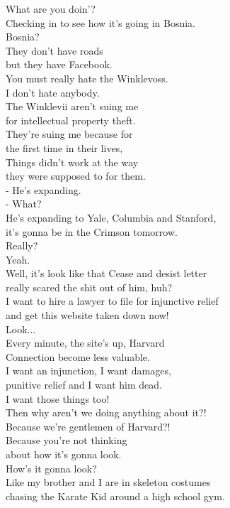 \documentclass{article}
\begin{document}
\begin{multicols}{3}
What are you doin'?\\
Checking in to see how it's going in Bosnia.\\
Bosnia?\\
They don't have roads\\
but they have Facebook.\\
You must really hate the Winklevoss.\\
I don't hate anybody.\\
The Winklevii aren't suing me\\
for intellectual property theft.\\
They're suing me because for\\
the first time in their lives,\\
Things didn't work at the way\\
they were supposed to for them.\\
- He's expanding.\\
- What?\\
He's expanding to Yale, Columbia and Stanford,\\
it's gonna be in the Crimson tomorrow.\\
Really?\\
Yeah.\\
Well, it's look like that Cease and desist letter\\
really scared the shit out of him, huh?\\
I want to hire a lawyer to file for injunctive relief\\
and get this website taken down now!\\
Look...\\
Every minute, the site's up, Harvard\\
Connection become less valuable.\\
I want an injunction, I want damages,\\
punitive relief and I want him dead.\\
I want those things too!\\
Then why aren't we doing anything about it?!\\
Because we're gentlemen of Harvard?!\\
Because you're not thinking\\
about how it's gonna look.\\
How's it gonna look?\\
Like my brother and I are in skeleton costumes\\
chasing the Karate Kid around a high school gym.\\

\end{multicols}
\end{document}
